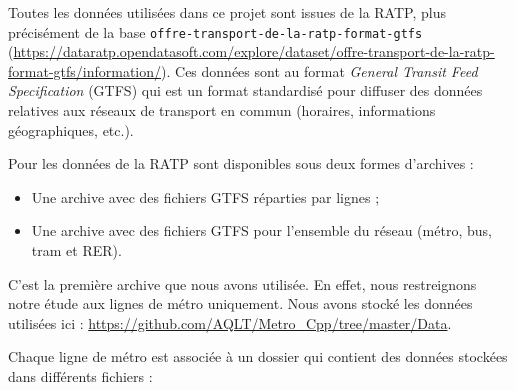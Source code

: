 \documentclass[,french]{article}
\providecommand{\tightlist}{%
  \setlength{\itemsep}{0pt}\setlength{\parskip}{0pt}}
\begin{document}
Toutes les données utilisées dans ce projet sont issues de la RATP, plus
précisément de la base \texttt{offre-transport-de-la-ratp-format-gtfs}
(\url{https://dataratp.opendatasoft.com/explore/dataset/offre-transport-de-la-ratp-format-gtfs/information/}).
Ces données sont au format \emph{General Transit Feed Specification}
(GTFS) qui est un format standardisé pour diffuser des données relatives
aux réseaux de transport en commun (horaires, informations
géographiques, etc.).

Pour les données de la RATP sont disponibles sous deux formes d'archives
:

\begin{itemize}
\tightlist
\item
  Une archive avec des fichiers GTFS réparties par lignes ;\\
\item
  Une archive avec des fichiers GTFS pour l'ensemble du réseau (métro,
  bus, tram et RER).
\end{itemize}

C'est la première archive que nous avons utilisée. En effet, nous
restreignons notre étude aux lignes de métro uniquement. Nous avons
stocké les données utilisées ici :
\url{https://github.com/AQLT/Metro_Cpp/tree/master/Data}.

Chaque ligne de métro est associée à un dossier qui contient des données
stockées dans différents fichiers :
\end{document}
